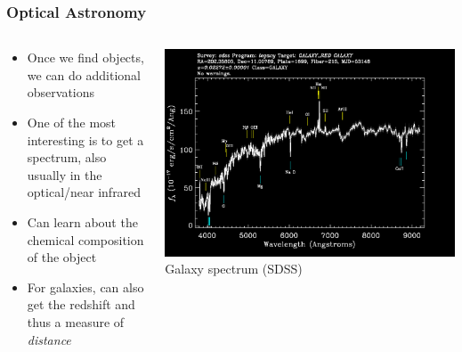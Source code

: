 \documentclass{beamer}
\begin{document}
\frame
{

    \frametitle{Optical Astronomy}


    \begin{columns}
        \begin{column}{0.5\textwidth}
            \begin{itemize}

                \item Once we find objects, we can do additional observations

                \item One of the most interesting is to get a spectrum, also
                    usually in the optical/near infrared

                \item Can learn about the chemical composition of the object

                \item For galaxies, can also get the redshift and thus
                    a measure of {\em distance}

            \end{itemize}
        \end{column}
        \begin{column}{0.5\textwidth}
            \begin{center}
                \includegraphics[width=\textwidth]{specById-inv.png}
                \newline
                {\tiny Galaxy spectrum (SDSS)}
            \end{center}

            
        \end{column}
    \end{columns}


}
\end{document}

